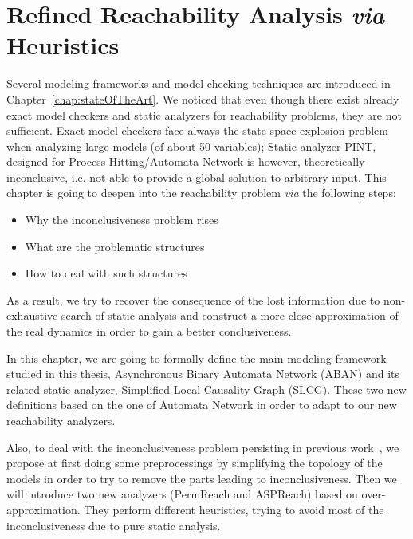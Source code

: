 \chapter{Refined Reachability Analysis \textit{via} Heuristics}\label{chap:refinement}
\begin{mybox}
Several modeling frameworks and model checking techniques are introduced in Chapter~\ref{chap:stateOfTheArt}.
We noticed that even though there exist already exact model checkers and static analyzers for reachability problems, they are not sufficient.
Exact model checkers face always the state space explosion problem when analyzing large models (of about 50 variables);
Static analyzer PINT, designed for Process Hitting/Automata Network is however, theoretically inconclusive, i.e. not able to provide a global solution to arbitrary input.
This chapter is going to deepen into the reachability problem \textit{via} the following steps:

\begin{itemize}
    \item Why the inconclusiveness problem rises
    \item What are the problematic structures
    \item How to deal with such structures
\end{itemize}

As a result, we try to recover the consequence of the lost information due to non-exhaustive search of static analysis and construct a more close approximation of the real dynamics in order to gain a better conclusiveness.
\end{mybox}

In this chapter, we are going to formally define the main modeling framework studied in this thesis, Asynchronous Binary Automata Network (ABAN) and its related static analyzer, Simplified Local Causality Graph (SLCG).
These two new definitions based on the one of Automata Network in order to adapt to our new reachability analyzers.

Also, to deal with the inconclusiveness problem persisting in previous work~\cite{folschette2015}, we propose at first doing some preprocessings by simplifying the topology of the models in order to try to remove the parts leading to inconclusiveness.
Then we will introduce two new analyzers (PermReach and ASPReach) based on over-approximation.
They perform different heuristics, trying to avoid most of the inconclusiveness due to pure static analysis.

